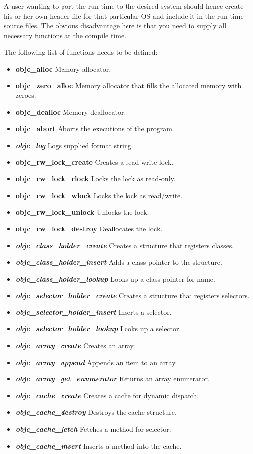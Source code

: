 A user wanting to port the run-time to the desired system should hence create his or her own header file for that particular OS and include it in the run-time source files. The obvious disadvantage here is that you need to supply all necessary functions at the compile time.

The following list of functions needs to be defined:

\begin{itemize}
  \item{\bf{objc\_alloc}} Memory allocator.
  \item{\bf{objc\_zero\_alloc}} Memory allocator that fills the allocated memory with zeroes.
  \item{\bf{objc\_dealloc}} Memory deallocator.
  \item{\bf{objc\_abort}} Aborts the executions of the program.
  \item{\bf{\emph{objc\_log}}} Logs supplied format string.
  \item{\bf{objc\_rw\_lock\_create}} Creates a read-write lock.
  \item{\bf{objc\_rw\_lock\_rlock}} Locks the lock as read-only.
  \item{\bf{objc\_rw\_lock\_wlock}} Locks the lock as read/write.
  \item{\bf{objc\_rw\_lock\_unlock}} Unlocks the lock.
  \item{\bf{objc\_rw\_lock\_destroy}} Deallocates the lock.
  \item{\bf{\emph{objc\_class\_holder\_create}}} Creates a structure that registers classes.
  \item{\bf{\emph{objc\_class\_holder\_insert}}} Adds a class pointer to the structure.
  \item{\bf{\emph{objc\_class\_holder\_lookup}}} Looks up a class pointer for name.
  \item{\bf{\emph{objc\_selector\_holder\_create}}} Creates a structure that registers selectors.
  \item{\bf{\emph{objc\_selector\_holder\_insert}}} Inserts a selector.
  \item{\bf{\emph{objc\_selector\_holder\_lookup}}} Looks up a selector.
  \item{\bf{\emph{objc\_array\_create}}} Creates an array.
  \item{\bf{\emph{objc\_array\_append}}} Appends an item to an array.
  \item{\bf{\emph{objc\_array\_get\_enumerator}}} Returns an array enumerator.
  \item{\bf{\emph{objc\_cache\_create}}} Creates a cache for dynamic dispatch.
  \item{\bf{\emph{objc\_cache\_destroy}}} Destroys the cache structure.
  \item{\bf{\emph{objc\_cache\_fetch}}} Fetches a method for selector.
  \item{\bf{\emph{objc\_cache\_insert}}} Inserts a method into the cache.
\end{itemize}

